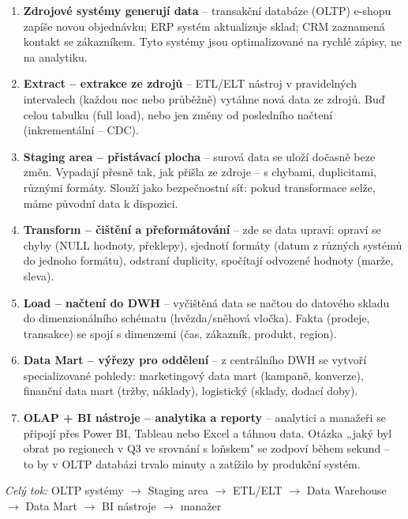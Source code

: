 \begin{enumerate}
  \item \textbf{Zdrojové systémy generují data} -- transakční databáze (OLTP) e-shopu zapíše
    novou objednávku; ERP systém aktualizuje sklad; CRM zaznamená kontakt se zákazníkem.
    Tyto systémy jsou optimalizované na rychlé zápisy, ne na analytiku.

  \item \textbf{Extract -- extrakce ze zdrojů} -- ETL/ELT nástroj v pravidelných intervalech
    (každou noc nebo průběžně) vytáhne nová data ze zdrojů. Buď celou tabulku (full load),
    nebo jen změny od posledního načtení (inkrementální -- CDC).

  \item \textbf{Staging area -- přistávací plocha} -- surová data se uloží dočasně beze změn.
    Vypadají přesně tak, jak přišla ze zdroje -- s chybami, duplicitami, různými formáty.
    Slouží jako bezpečnostní síť: pokud transformace selže, máme původní data k dispozici.

  \item \textbf{Transform -- čištění a přeformátování} -- zde se data upraví:
    opraví se chyby (NULL hodnoty, překlepy), sjednotí formáty (datum z různých systémů
    do jednoho formátu), odstraní duplicity, spočítají odvozené hodnoty (marže, sleva).

  \item \textbf{Load -- načtení do DWH} -- vyčištěná data se načtou do datového skladu
    do dimenzionálního schématu (hvězda/sněhová vločka). Fakta (prodeje, transakce)
    se spojí s dimenzemi (čas, zákazník, produkt, region).

  \item \textbf{Data Mart -- výřezy pro oddělení} -- z centrálního DWH se vytvoří
    specializované pohledy: marketingový data mart (kampaně, konverze), finanční data mart
    (tržby, náklady), logistický (sklady, dodací doby).

  \item \textbf{OLAP + BI nástroje -- analytika a reporty} -- analytici a manažeři
    se připojí přes Power BI, Tableau nebo Excel a táhnou data. Otázka „jaký byl obrat
    po regionech v Q3 ve srovnání s loňskem" se zodpoví během sekund -- to by v OLTP
    databázi trvalo minuty a zatížilo by produkční systém.
\end{enumerate}

\textit{Celý tok:} OLTP systémy $\to$ Staging area $\to$ ETL/ELT $\to$ Data Warehouse $\to$ Data Mart $\to$ BI nástroje $\to$ manažer

